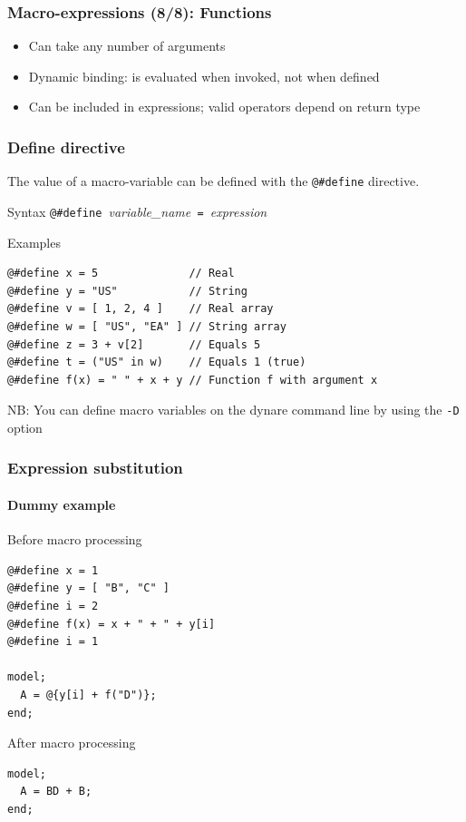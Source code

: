 \documentclass{beamer}
\begin{document}
\begin{frame}[fragile=singleslide]
  \frametitle{Macro-expressions (8/8): Functions}
  \begin{itemize}
  \item Can take any number of arguments
  \item Dynamic binding: is evaluated when invoked, not when defined
  \item Can be included in expressions; valid operators depend on return type
  \end{itemize}
\end{frame}

\begin{frame}[fragile=singleslide]
  \frametitle{Define directive}

  The value of a macro-variable can be defined with the \verb+@#define+ directive.

  \begin{block}{Syntax}
    \verb+@#define +\textit{variable\_name}\verb+ = +\textit{expression}
  \end{block}

  \begin{block}{Examples}
\begin{verbatim}
@#define x = 5              // Real
@#define y = "US"           // String
@#define v = [ 1, 2, 4 ]    // Real array
@#define w = [ "US", "EA" ] // String array
@#define z = 3 + v[2]       // Equals 5
@#define t = ("US" in w)    // Equals 1 (true)
@#define f(x) = " " + x + y // Function f with argument x
\end{verbatim}
  \end{block}
  NB: You can define macro variables on the dynare command line by using the \texttt{-D} option
\end{frame}

\begin{frame}[fragile=singleslide]
  \frametitle{Expression substitution}
  \framesubtitle{Dummy example}
  \begin{block}{Before macro processing}
\begin{verbatim}
@#define x = 1
@#define y = [ "B", "C" ]
@#define i = 2
@#define f(x) = x + " + " + y[i]
@#define i = 1

model;
  A = @{y[i] + f("D")};
end;
\end{verbatim}
  \end{block}
  \begin{block}{After macro processing}
\begin{verbatim}
model;
  A = BD + B;
end;
\end{verbatim}
  \end{block}
\end{frame}
\end{document}
